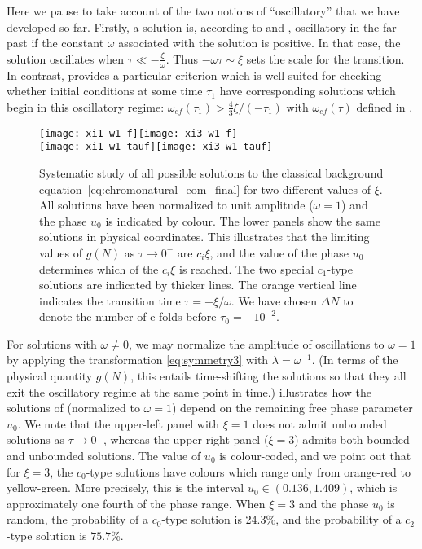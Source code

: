 Here we pause to take account of the two notions of ``oscillatory'' that we have developed so far. Firstly, a solution is, according to  and , oscillatory in the far past if the constant $\omega$ associated with the solution is positive. In that case, the solution oscillates when $\tau\ll-\frac{\xi}{\omega}$. Thus $-\omega\tau\sim\xi$ sets the scale for the transition. In contrast,  provides a particular criterion which is well-suited for checking whether initial conditions at some time $\tau_{1}$ have corresponding solutions which begin in this oscillatory regime: $\omega_{ef}(\tau_{1})>\tfrac{4}{3}\xi/(-\tau_{1})$ with $\omega_{ef}(\tau)$ defined in . 

\begin{figure}[t]
\centering{}\texttt{[image: xi1-w1-f]}\hfill{}\texttt{[image: xi3-w1-f]}\\
\texttt{[image: xi1-w1-tauf]}\hfill{}\texttt{[image: xi3-w1-tauf]} \caption{\label{fig:omega_eq_1} Systematic study of all possible solutions to the classical background equation~\eqref{eq:chromonatural_eom_final} for two different values of $\xi$. All solutions have been normalized to unit amplitude ($\omega=1$) and the phase $u_{0}$ is indicated by colour. The lower panels show the same solutions in physical coordinates. This illustrates that the limiting values of $g(N)$ as $\tau\to0^{-}$ are $c_{i}\xi$, and the value of the phase $u_{0}$ determines which of the $c_{i}\xi$ is reached. The two special $c_{1}$\protect\nobreakdash-type solutions are indicated by thicker lines. The orange vertical line indicates the transition time $\tau=-\xi/\omega$. We have chosen $\Delta N$ to denote the number of e-folds before $\tau_{0}=-10^{-2}$. }
\end{figure}
For solutions with $\omega\neq0$, we may normalize the amplitude of oscillations to $\omega=1$ by applying the transformation \eqref{eq:symmetry3} with $\lambda=\omega^{-1}$. (In terms of the physical quantity $g(N)$, this entails time-shifting the solutions so that they all exit the oscillatory regime at the same point in time.)  illustrates how the solutions of  (normalized to $\omega=1$) depend on the remaining free phase parameter $u_{0}$. We note that the upper-left panel with $\xi=1$ does not admit unbounded solutions as $\tau\rightarrow0^{-}$, whereas the upper-right panel ($\xi=3$) admits both bounded and unbounded solutions. The value of $u_{0}$ is colour-coded, and we point out that for $\xi=3$, the $c_{0}$\nobreakdash-type solutions have colours which range only from orange-red to yellow-green. More precisely, this is the interval $u_{0}\in\left(0.136,1.409\right)$, which is approximately one fourth of the phase range. When $\xi=3$ and the phase $u_{0}$ is random, the probability of a $c_{0}$\nobreakdash-type solution is 24.3\%, and the probability of a $c_{2}$\nobreakdash-type solution is $75.7$\%.

